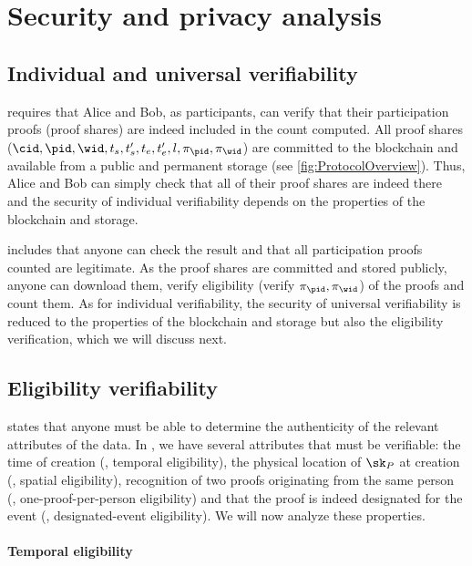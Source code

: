 \section{Security and privacy analysis}%
\label{SecurityAnalysis}

\subsection{Individual and universal verifiability}%
\label{analysis-individual}%
\label{analysis-universal}

 requires that Alice and Bob, as participants, can verify that their participation proofs (\ie proof shares) are indeed included in the count computed.
All proof shares (\ie \(\cid, \pid, \wid, t_s, t_s', t_e, t_e', l, \pi_\pid, \pi_{\wid}\)) are committed to the blockchain and available from a public and permanent storage (see \cref{fig:ProtocolOverview}).
Thus, Alice and Bob can simply check that all of their proof shares are indeed there and the security of individual verifiability depends on the properties of the blockchain and storage.

  includes that anyone can check the result and that all participation proofs counted are legitimate.
As the proof shares are committed and stored publicly, anyone can
download them, verify eligibility (\ie verify \(\pi_\pid,
\pi_{\wid}\)) of the proofs and count them.
As for individual verifiability, the security of universal verifiability is reduced to the properties of the blockchain and storage but also the eligibility verification, which we will discuss next.

\subsection{Eligibility verifiability}
\label{analysis-eligibility}

 states that anyone must be able to determine the authenticity of the relevant attributes of the data.
In \PRIVO, we have several attributes that must be verifiable: the time of creation (\ie, temporal eligibility), the physical location of \(\sk_P\) at creation (\ie, spatial eligibility), recognition of two proofs originating from the same person (\ie, one-proof-per-person eligibility) and that the proof is indeed designated for the event (\ie, designated-event eligibility).
We will now analyze these properties.

\paragraph{Temporal eligibility}
\label{analysis-temporal}

